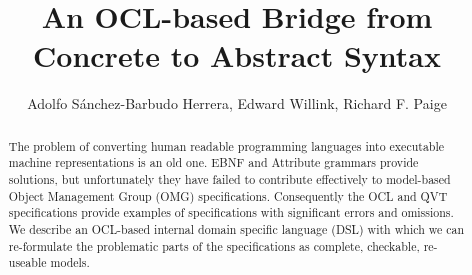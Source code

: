 \documentclass{llncs}
\begin{document}
\title{An OCL-based Bridge from Concrete to Abstract Syntax}

\author{Adolfo S\'{a}nchez-Barbudo Herrera, Edward Willink,
Richard F. Paige}

\maketitle

\begin{abstract}
The problem of converting human readable programming languages into executable machine representations is an old one. EBNF and Attribute grammars provide solutions, but unfortunately they have failed to contribute effectively to model-based Object Management Group (OMG)  specifications. Consequently the OCL and QVT specifications provide examples of specifications with significant errors and omissions.  We describe an OCL-based internal domain specific language (DSL) with which we can re-formulate the problematic parts of the specifications as complete, checkable, re-useable models.

\end{abstract}
\end{document}
